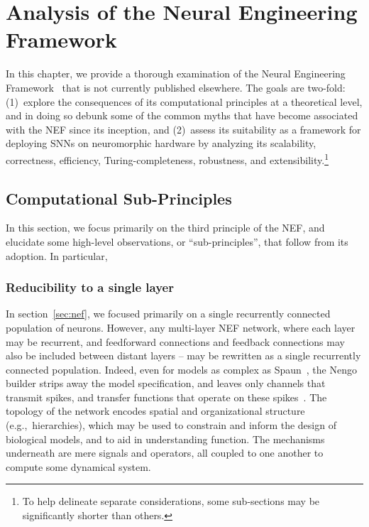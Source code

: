 \chapter{Analysis of the Neural Engineering Framework}
\label{chapt:analysis}

In this chapter, we provide a thorough examination of the Neural Engineering Framework~\citep[NEF;][]{eliasmith2003a} that is not currently published elsewhere.
The goals are two-fold: (1)~explore the consequences of its computational principles at a theoretical level, and in doing so debunk some of the common myths that have become associated with the NEF since its inception, and (2)~assess its suitability as a framework for deploying SNNs on neuromorphic hardware by analyzing its scalability, correctness, efficiency, Turing-completeness, robustness, and extensibility.\footnote{
To help delineate separate considerations, some sub-sections may be significantly shorter than others.
}

\section{Computational Sub-Principles}

In this section, we focus primarily on the third principle of the NEF, and elucidate some high-level observations, or ``sub-principles'', that follow from its adoption.
In particular, 

\subsection{Reducibility to a single layer}

In section~\ref{sec:nef}, we focused primarily on a single recurrently connected population of neurons.
However, any multi-layer NEF network, where each layer may be recurrent, and feedforward connections and feedback connections may also be included between distant layers -- may be rewritten as a single recurrently connected population.
Indeed, even for models as complex as Spaun~\citep{eliasmith2012, choo2018}, the Nengo builder strips away the model specification, and leaves only channels that transmit spikes, and transfer functions that operate on these spikes~\citep{bekolay2014, gosmann2017automatic}.
The topology of the network encodes spatial and organizational structure (e.g.,~hierarchies), which may be used to constrain and inform the design of biological models, and to aid in understanding function.
The mechanisms underneath are mere signals and operators, all coupled to one another to compute some dynamical system.

